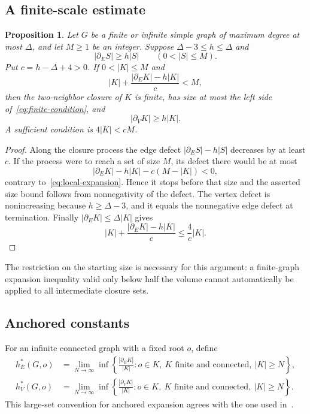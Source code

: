 \documentclass[11pt]{amsart}
\numberwithin{equation}{section}
\newtheorem{proposition}[theorem]{Proposition}
\theoremstyle{definition}
\theoremstyle{remark}
\newcommand{\hE}{h_E}
\newcommand{\hV}{h_V}
\newcommand{\bE}{\partial_E}
\newcommand{\bV}{\partial_V}
\begin{document}
\subsection{A finite-scale estimate}
\begin{proposition}\label{prop:finite-scale}
Let $G$ be a finite or infinite simple graph of maximum degree at most $\Delta$, and let $M\ge1$ be an integer. Suppose $\Delta-3\le h\le\Delta$ and
\begin{equation}\label{eq:local-expansion}
|\bE S|\ge h|S|\qquad(0<|S|\le M).
\end{equation}
Put $c=h-\Delta+4>0$. If $0<|K|\le M$ and
\begin{equation}\label{eq:finite-condition}
|K|+\frac{|\bE K|-h|K|}{c}<M,
\end{equation}
then the two-neighbor closure of $K$ is finite, has size at most the left side of~\eqref{eq:finite-condition}, and
\[
|\bV K|\ge h|K|.
\]
A sufficient condition is $4|K|<cM$.
\end{proposition}
\begin{proof}
Along the closure process the edge defect $|\bE S|-h|S|$ decreases by at least $c$. If the process were to reach a set of size $M$, its defect there would be at most
\[
|\bE K|-h|K|-c(M-|K|)<0,
\]
contrary to~\eqref{eq:local-expansion}. Hence it stops before that size and the asserted size bound follows from nonnegativity of the defect. The vertex defect is nonincreasing because $h\ge\Delta-3$, and it equals the nonnegative edge defect at termination. Finally $|\bE K|\le\Delta|K|$ gives
\[
|K|+\frac{|\bE K|-h|K|}{c}\le\frac4c|K|.
\]
\end{proof}

The restriction on the starting size is necessary for this argument: a finite-graph expansion inequality valid only below half the volume cannot automatically be applied to all intermediate closure sets.

\subsection{Anchored constants}
For an infinite connected graph with a fixed root $o$, define
\begin{align*}
\hE^*(G,o)&=\lim_{N\to\infty}\inf\left\{\frac{|\bE K|}{|K|}:o\in K,\ K\text{ finite and connected},\ |K|\ge N\right\},\\
\hV^*(G,o)&=\lim_{N\to\infty}\inf\left\{\frac{|\bV K|}{|K|}:o\in K,\ K\text{ finite and connected},\ |K|\ge N\right\}.
\end{align*}
This large-set convention for anchored expansion agrees with the one used in~\cite{BPP}.
\end{document}
